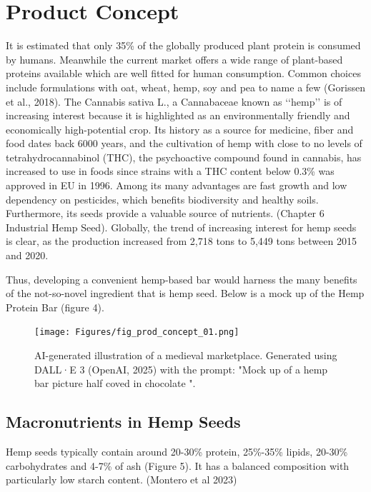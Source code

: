 \chapter{Product Concept}
\setlength{\headheight}{22.94003pt}
\addtolength{\topmargin}{-10.22661pt}

It is estimated that only 35\% of the globally produced plant protein is consumed by humans. Meanwhile the current market offers a wide range of plant-based proteins available which are well fitted for human consumption. Common choices include formulations with oat, wheat, hemp, soy and pea to name a few (Gorissen et al., 2018). The Cannabis sativa L., a Cannabaceae known as ‘‘hemp’’ is of increasing interest because it is highlighted as an environmentally friendly and economically high-potential crop. Its history as a source for medicine, fiber and food dates back 6000 years, and the cultivation of hemp with close to no levels of tetrahydrocannabinol (THC), the psychoactive compound found in cannabis, has increased to use in foods since strains with a THC content below 0.3\% was approved in EU in 1996. Among its many advantages are fast growth and low dependency on pesticides, which benefits biodiversity and healthy soils. Furthermore, its seeds provide a valuable source of nutrients. (Chapter 6 Industrial Hemp Seed). Globally, the trend of increasing interest for hemp seeds is clear, as the production increased from 2,718 tons to 5,449 tons between 2015 and 2020. 

\vspace{1em}
Thus, developing a convenient hemp-based bar would harness the many benefits of the not-so-novel ingredient that is hemp seed. Below is a mock up of the Hemp Protein Bar (figure 4).

\begin{figure}[H]
    \centering
    \texttt{[image: Figures/fig\_prod\_concept\_01.png]}
    \caption{AI-generated illustration of a medieval marketplace. Generated using DALL·E 3 (OpenAI, 2025) with the prompt: "Mock up of a hemp bar picture half coved in chocolate ".}
    \label{fig:prod_concept_01}
\end{figure}


\section{Macronutrients in Hemp Seeds}
Hemp seeds typically contain around 20-30\% protein, 25\%-35\% lipids, 20-30\% carbohydrates and 4-7\% of ash (Figure 5). It has a balanced composition with particularly low starch content. (Montero et al 2023) 

